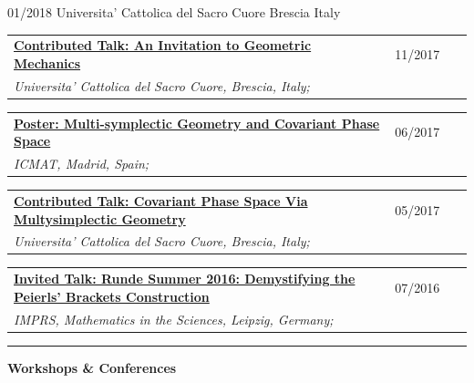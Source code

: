 \documentclass[a4paper]{article}
\newcommand{\block}[1]{\hrule \vspace{0.2cm} \textbf{\Large #1} \vspace{0.2cm}}
\newcommand{\longvoice}[8]{
	\begin{tabular}{p{0.83\linewidth} p{0.17\linewidth} }
		\textbf{\href{#3}{#2: #1}} & #4 
		\\ 
		\textit{#5, #6, #7;} & {\small\emph{#8}}
	\end{tabular}
	\vspace{.5em}
}
\begin{document}
		{01/2018}
		{Universita' Cattolica del Sacro Cuore}
		{Brescia}
		{Italy}
		{}
	\longvoice{An Invitation to Geometric Mechanics}
		{Contributed Talk}
		{https://www.dropbox.com/s/k066hn2ubovhaop/1711-talk-invitationGeoMec.pdf?dl=0}
		{11/2017}
		{Universita' Cattolica del Sacro Cuore}
		{Brescia}
		{Italy}
		{}
	\longvoice{Multi-symplectic Geometry and Covariant Phase Space}
		{Poster}
		{https://www.researchgate.net/publication/319301416_Multi-symplectic_Geometry_and_Covariant_Phase_Space}
		{06/2017}
		{ICMAT}
		{Madrid}
		{Spain}
		{}
	\longvoice{Covariant Phase Space Via Multysimplectic Geometry}
		{Contributed Talk}
		{https://www.researchgate.net/publication/319301194_Notes_on_Covariant_Phase_Space_via_MultiSymplectic_Geometry}
		{05/2017}
		{Universita' Cattolica del Sacro Cuore}
		{Brescia}
		{Italy}
		{}
	\longvoice{Runde Summer 2016: Demystifying the Peierls' Brackets Construction}
		{Invited Talk}
		{https://www.dropbox.com/s/slk28t877e2nxtq/1607-Liepzig-RundeSummer.PDF?dl=0}
		{07/2016}
		{IMPRS, Mathematics in the Sciences}
		{Leipzig}
		{Germany}
		{}


	\block{Workshops \& Conferences}
\end{document}
